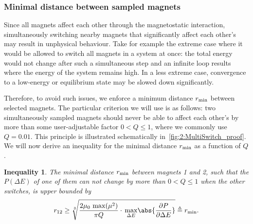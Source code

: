 \subsubsection{Minimal distance between sampled magnets}\label{sec:2:MultiSwitch:rmin} %
Since all magnets affect each other through the magnetostatic interaction, simultaneously switching nearby magnets that significantly affect each other's  may result in unphysical behaviour.
Take for example the extreme case where it would be allowed to switch all magnets in a system at once: the total energy would not change after such a simultaneous step and an infinite loop results where the energy of the system remains high.
In a less extreme case, convergence to a low-energy or equilibrium state may be slowed down significantly. \par
Therefore, to avoid such issues, we enforce a minimum distance $r_\mathrm{min}$ between selected magnets.
The particular criterion we will use is as follows: two simultaneously sampled magnets should never be able to affect each other's  by more than some user-adjustable factor $0 < Q \leq 1$, where we commonly use $Q=0.01$.
This principle is illustrated schematically in~\cref{fig:2:MultiSwitch_proof}.
We will now derive an inequality for the minimal distance $r_\mathrm{min}$ as a function of $Q$.
\newtheorem{inequality}{Inequality}
\begin{inequality}
	The minimal distance $r_\mathrm{min}$ between magnets 1 and 2, such that the  $P(\Delta E)$ of one of them can not change by more than $0 < Q \leq 1$ when the other switches, is upper bounded by
	\begin{equation}
		r_{12} \geq \sqrt[3]{\frac{2 \mu_0 \, \max(\mu^2)}{\pi Q} \cdot \, \underset{\Delta E}{\max} \abs{\frac{\partial P}{\partial \Delta E}}} \triangleq \rmin \mathrm{.}
		\label{eq:2:MultiSwitch_inequality}
	\end{equation}
\end{inequality}


